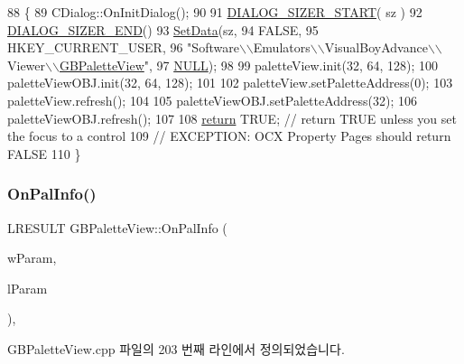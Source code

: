 \begin{DoxyCode}
88 \{
89   CDialog::OnInitDialog();
90   
91   \mbox{\hyperlink{_resize_dlg_8h_acb9d1d22d9838f6dda8a61cfa132997c}{DIALOG\_SIZER\_START}}( sz )
92     \mbox{\hyperlink{_resize_dlg_8h_aeac0c1e32f30e0763df5736e4b3ea50a}{DIALOG\_SIZER\_END}}()
93     \mbox{\hyperlink{class_resize_dlg_a6a3965f44a0c2f5ba9aaa798a9a81df5}{SetData}}(sz,
94             FALSE,
95             HKEY\_CURRENT\_USER,
96             "Software\(\backslash\)\(\backslash\)Emulators\(\backslash\)\(\backslash\)VisualBoyAdvance\(\backslash\)\(\backslash\)Viewer\(\backslash\)\(\backslash\)\mbox{\hyperlink{class_g_b_palette_view}{GBPaletteView}}",
97             \mbox{\hyperlink{getopt1_8c_a070d2ce7b6bb7e5c05602aa8c308d0c4}{NULL}});
98 
99   paletteView.init(32, 64, 128);
100   paletteViewOBJ.init(32, 64, 128);
101   
102   paletteView.setPaletteAddress(0);
103   paletteView.refresh();  
104   
105   paletteViewOBJ.setPaletteAddress(32);
106   paletteViewOBJ.refresh();  
107   
108   \mbox{\hyperlink{gb_codes_8h_a9717e7bbecb906637e86cef6da3d83c2}{return}} TRUE;  \textcolor{comment}{// return TRUE unless you set the focus to a control}
109                 \textcolor{comment}{// EXCEPTION: OCX Property Pages should return FALSE}
110 \}
\end{DoxyCode}
\mbox{\label{class_g_b_palette_view_a01960a28d93aef1873f5d5256fa11c79}} 
\subsubsection{\texorpdfstring{On\+Pal\+Info()}{OnPalInfo()}}
{\footnotesize\ttfamily L\+R\+E\+S\+U\+LT G\+B\+Palette\+View\+::\+On\+Pal\+Info (\begin{DoxyParamCaption}\item[{W\+P\+A\+R\+AM}]{w\+Param,  }\item[{L\+P\+A\+R\+AM}]{l\+Param }\end{DoxyParamCaption})\hspace{0.3cm}{\ttfamily [protected]}, {\ttfamily [virtual]}}



G\+B\+Palette\+View.\+cpp 파일의 203 번째 라인에서 정의되었습니다.


